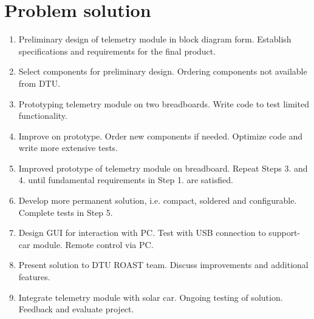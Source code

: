 \documentclass[]{article}
\begin{document}
\section{Problem solution}
\begin{enumerate}
    \item Preliminary design of telemetry module in block diagram form. Establish specifications and requirements for the final product. 
    \item Select components for preliminary design. Ordering components not available from DTU. 
    \item Prototyping telemetry module on two breadboards. Write code to test limited functionality. 
    \item Improve on prototype. Order new components if needed. Optimize code and write more extensive tests. 
    \item Improved prototype of telemetry module on breadboard. Repeat Steps 3. and 4. until fundamental requirements in Step 1. are satisfied. 
    \item Develop more permanent solution, i.e. compact, soldered and configurable. Complete tests in Step 5.
    \item Design GUI for interaction with PC. Test with USB connection to support-car module. Remote control via PC. 
    \item Present solution to DTU ROAST team. Discuss improvements and additional features. 
    \item Integrate telemetry module with solar car. Ongoing testing of solution. Feedback and evaluate project. 
\end{enumerate}
\end{document}
